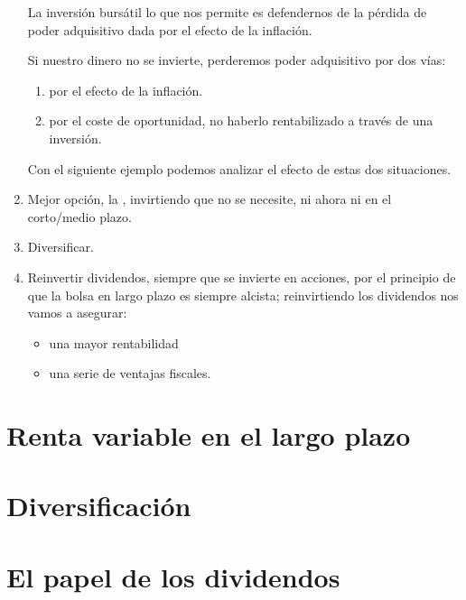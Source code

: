 \begin{enumerate}[label=\alph*)]
    La inversión bursátil lo que nos permite es defendernos de la pérdida de poder adquisitivo dada por el efecto de la inflación.

    Si nuestro dinero no se invierte, perderemos poder adquisitivo por dos vías:
    \begin{enumerate}
        \item por el efecto de la inflación.
        \item por el coste de oportunidad, no haberlo rentabilizado a través de una inversión.
    \end{enumerate}

    Con el siguiente ejemplo podemos analizar el efecto de estas dos situaciones.

    \begin{testexample}
        
    \end{testexample}
    
    \item Mejor opción, la , invirtiendo que no se necesite, ni ahora ni en el corto/medio plazo.
    \item Diversificar.
    \item Reinvertir dividendos, siempre que se invierte en acciones, por el principio de que la bolsa en largo plazo es siempre alcista; reinvirtiendo los dividendos nos vamos a asegurar:
    \begin{itemize}
        \item una mayor rentabilidad
        \item una serie de ventajas fiscales.
    \end{itemize}
\end{enumerate}

\section{Renta variable en el largo plazo}

\section{Diversificación}


\section{El papel de los dividendos}